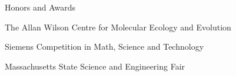 \documentclass[11pt]{tracv}
\begin{document}
    \begin{columnsection}{Honors and Awards}

        The Allan Wilson Centre for Molecular Ecology and Evolution

        Siemens Competition in Math, Science and Technology

        Massachusetts State Science and Engineering Fair

    \end{columnsection}
\end{document}

